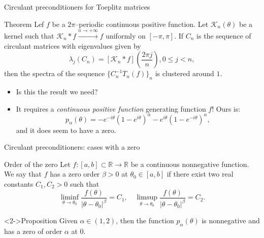 \documentclass[aspectratio=169,xcolor=dvipsnames]{beamer}
\begin{document}
\begin{frame}{Circulant preconditioners for Toeplitz matrices}

\begin{alertblock}{Theorem \parencite{MR1173187}}
Lef $f$ be a $2\pi$--periodic \alert<2>{continuous positive function}. Let
$\mathcal{K}_n(\theta)$ be a kernel such that $\mathcal{K}_n * f
\overset{n \rightarrow +\infty}{\longrightarrow} f$ uniformly on
$[-\pi,\pi]$. If $C_n$ is the sequence of circulant matrices with
eigenvalues given by
\[
\lambda_j(C_n) = \left[ \mathcal{K}_n * f \right] \left(\frac{2\pi j}{n}\right), 0 \leq j < n,
\]
then the spectra of the sequence $\{C_n^{-1}T_n(f)\}_n$ is clustered
around $1$.
\end{alertblock}

\begin{itemize}
	\item[\faQuestionCircle] Is this the result we need?
	\item[\faExclamationCircle]<2> It requires a \emph{continuous positive function} generating function $f$! Ours is:
	\[
	 p_\alpha(\theta) = -e^{-i\theta}(1-e^{i\theta})^\alpha - e^{i\theta}(1-e^{-i\theta})^\alpha,
	\]
	and it does seem to have a zero.
\end{itemize}

\end{frame}

\begin{frame}{Circulant preconditioners: cases with a zero}

\begin{block}{Order of the zero}
Let $f:[a,b] \subset \mathbb{R} \rightarrow \mathbb{R}$ be a continuous nonnegative function. We say that $f$ has a zero order $\beta > 0$ at $\theta_0 \in [a,b]$ if there exist two real constants $C_1,C_2 > 0$ such that
\[
\liminf_{\theta \rightarrow \theta_0} \frac{f(\theta)}{|\theta - \theta_0|^\beta} = C_1, \quad \limsup_{\theta \rightarrow \theta_0} \frac{f(\theta)}{|\theta - \theta_0|^\beta} = C_2.
\]
\end{block}

\begin{alertblock}<2->{Proposition \parencite{MR3448208}}
Given $\alpha \in (1,2)$, then the function $p_\alpha(\theta)$ is nonnegative and has a zero of order $\alpha$ at $0$.
\end{alertblock}


\end{frame}
\end{document}
